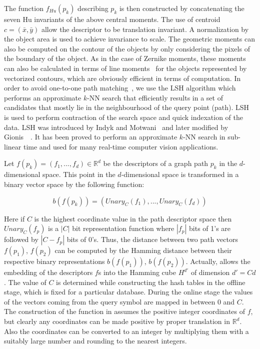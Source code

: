 The function $f_{Hu}(p_k)$ describing $p_k$ is then constructed by concatenating the seven Hu invariants of the above central moments. The use of centroid $c=(\bar{x},\bar{y})$ allow the descriptor to be translation invariant. A normalization by the object area is used to achieve invariance to scale. The geometric moments can also be computed on the contour of the objects by only considering the pixels of the boundary of the object. As in the case of Zernike moments, these moments can also be calculated in terms of line moments~\cite {Lambert1995, Lambert1996} for the objects represented by vectorized contours, which are obviously efficient in terms of computation.
\label{ssec:hssg:lsh}
In order to avoid one-to-one path matching~\cite{Dutta2011a}, we use the LSH algorithm which performs an approximate $k$-NN search that efficiently results in a set of candidates that mostly lie in the neighbourhood of the query point (path). LSH is used to perform contraction of the search space and quick indexation of the data. LSH was introduced by Indyk and Motwani~\cite{Indyk1998} and later modified by Gionis~\etal~\cite{Gionis1999}. It has been proved to perform an approximate $k$-NN search in sub-linear time and used for many real-time computer vision applications.

Let $f(p_k) = (f_1, ..., f_d)\in\mathbb{R}^d$ be the descriptors of a graph path $p_k$ in the $d$-dimensional space. This point in the $d$-dimensional space is transformed in a binary vector space by the following function:

\begin{equation}
b(f(p_k))=(Unary_C(f_1), ..., Unary_C(f_d))
\label{eqn:hssg:unr}
\end{equation}

Here if $C$ is the highest coordinate value in the path descriptor space then $Unary_C(f_p)$ is a $\left|C\right|$ bit representation function where $\left|f_p\right|$ bits of 1's are followed by $\left|C-f_p\right|$ bits of 0's. Thus, the distance between two path vectors $f(p_1)$, $f(p_2)$ can be computed by the Hamming distance between their respective binary representations $b(f(p_1))$, $b(f(p_2))$. Actually,  allows the embedding of the descriptors $f$s into the Hamming cube $H^{d'}$ of dimension $d' = Cd$. The value of $C$ is determined while constructing the hash tables in the offline stage, which is fixed for a particular database. During the online stage the values of the vectors coming from the query symbol are mapped in between $0$ and $C$. The construction of the function in  assumes the positive integer coordinates of $f$, but clearly any coordinates can be made positive by proper translation in $\mathbb{R}^d$. Also the coordinates can be converted to an integer by multiplying them with a suitably large number and rounding to the nearest integers.

